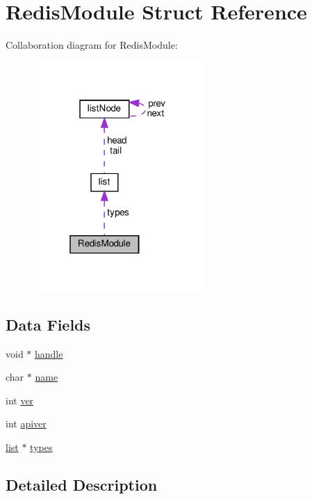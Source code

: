 \hypertarget{struct_redis_module}{}\section{Redis\+Module Struct Reference}
\label{struct_redis_module}


Collaboration diagram for Redis\+Module\+:
\nopagebreak
\begin{figure}[H]
\begin{center}
\leavevmode
\includegraphics[width=184pt]{struct_redis_module__coll__graph}
\end{center}
\end{figure}
\subsection*{Data Fields}
\begin{DoxyCompactItemize}
\item 
void $\ast$ \hyperlink{struct_redis_module_a81011b79683fab64ce3aff71114f8fdd}{handle}
\item 
char $\ast$ \hyperlink{struct_redis_module_a5ac083a645d964373f022d03df4849c8}{name}
\item 
int \hyperlink{struct_redis_module_a88ca8dd6d8b1535e6ba06c4d988c525b}{ver}
\item 
int \hyperlink{struct_redis_module_a46c9e15c261ef13e44f9948ab8982c9e}{apiver}
\item 
\hyperlink{structlist}{list} $\ast$ \hyperlink{struct_redis_module_a29d541640e7d78fbb0cc37bd2f814429}{types}
\end{DoxyCompactItemize}


\subsection{Detailed Description}


